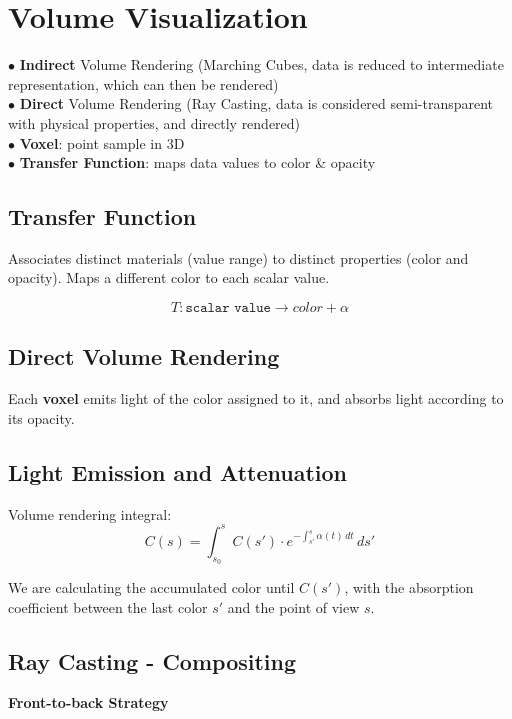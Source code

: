 
\section{Volume Visualization}
$\bullet$ \textbf{Indirect} Volume Rendering (Marching Cubes, data is reduced to intermediate representation, which can then be rendered) \\
$\bullet$ \textbf{Direct} Volume Rendering (Ray Casting, data is considered semi-transparent with physical properties, and directly rendered) \\
$\bullet$ \textbf{Voxel}: point sample in 3D \\
$\bullet$ \textbf{Transfer Function}: maps data values to color \& opacity

\begin{center}
\end{center}

\subsection{Transfer Function}
Associates distinct materials (value range) to distinct properties (color and opacity). Maps a different color to each scalar value.

$$T: \texttt{scalar value} \rightarrow color + \alpha$$

\subsection{Direct Volume Rendering}
Each \textbf{voxel} emits light of the color assigned to it, and absorbs light according to its opacity.

\subsection{Light Emission and Attenuation}
Volume rendering integral:
$$C(s) = \int_{s_0}^{s} C(s') \cdot e^{-\int_{s'}^s \alpha(t) \,dt} \,ds'$$

We are calculating the accumulated color until $C(s')$, with the absorption coefficient between the last color $s'$ and the point of view $s$.

\subsection{Ray Casting - Compositing}
\textbf{Front-to-back Strategy}

